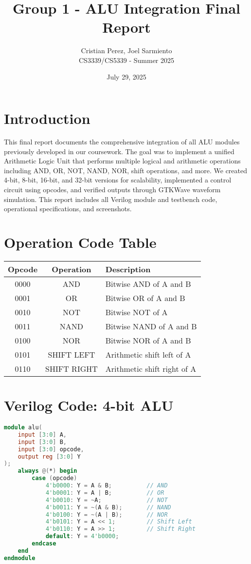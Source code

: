 \documentclass{article}
\title{Group 1 - ALU Integration Final Report}
\author{Cristian Perez, Joel Sarmiento \\ CS3339/CS5339 - Summer 2025}
\date{July 29, 2025}
\begin{document}
\maketitle

\section*{Introduction}
This final report documents the comprehensive integration of all ALU modules previously developed in our coursework. The goal was to implement a unified Arithmetic Logic Unit that performs multiple logical and arithmetic operations including AND, OR, NOT, NAND, NOR, shift operations, and more. We created 4-bit, 8-bit, 16-bit, and 32-bit versions for scalability, implemented a control circuit using opcodes, and verified outputs through GTKWave waveform simulation. This report includes all Verilog module and testbench code, operational specifications, and screenshots.

\section*{Operation Code Table}
\begin{center}
\begin{tabular}{|c|c|l|}
\hline
\textbf{Opcode} & \textbf{Operation} & \textbf{Description} \\ \hline
0000 & AND & Bitwise AND of A and B \\ \hline
0001 & OR & Bitwise OR of A and B \\ \hline
0010 & NOT & Bitwise NOT of A \\ \hline
0011 & NAND & Bitwise NAND of A and B \\ \hline
0100 & NOR & Bitwise NOR of A and B \\ \hline
0101 & SHIFT LEFT & Arithmetic shift left of A \\ \hline
0110 & SHIFT RIGHT & Arithmetic shift right of A \\ \hline
\end{tabular}
\end{center}

\section*{Verilog Code: 4-bit ALU}
\begin{lstlisting}[language=Verilog]
module alu(
    input [3:0] A,
    input [3:0] B,
    input [3:0] opcode,
    output reg [3:0] Y
);
    always @(*) begin
        case (opcode)
            4'b0000: Y = A & B;          // AND
            4'b0001: Y = A | B;          // OR
            4'b0010: Y = ~A;             // NOT
            4'b0011: Y = ~(A & B);       // NAND
            4'b0100: Y = ~(A | B);       // NOR
            4'b0101: Y = A << 1;         // Shift Left
            4'b0110: Y = A >> 1;         // Shift Right
            default: Y = 4'b0000;
        endcase
    end
endmodule
\end{lstlisting}
\end{document}
